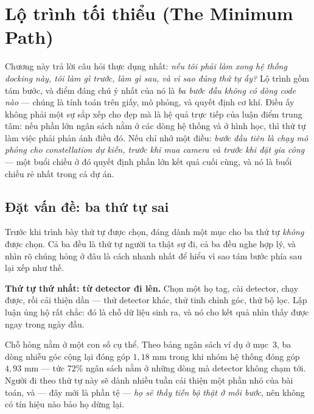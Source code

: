 \documentclass[../../marker.tex]{subfiles}
\begin{document}
\chapter{Lộ trình tối thiểu (The Minimum Path)}

\begin{tomtat}
Chương này trả lời câu hỏi thực dụng nhất: \emph{nếu tôi phải làm xong hệ thống docking này, tôi làm gì trước, làm gì sau, và vì sao đúng thứ tự ấy?} Lộ trình gồm tám bước, và điểm đáng chú ý nhất của nó là \emph{ba bước đầu không có dòng code nào} --- chúng là tính toán trên giấy, mô phỏng, và quyết định cơ khí. Điều ấy không phải một sự sắp xếp cho đẹp mà là hệ quả trực tiếp của luận điểm trung tâm: nếu phần lớn ngân sách nằm ở các dòng hệ thống và ở hình học, thì thứ tự làm việc phải phản ánh điều đó. Nếu chỉ nhớ một điều: \emph{bước đầu tiên là chạy mô phỏng cho constellation dự kiến, trước khi mua camera và trước khi đặt gia công} --- một buổi chiều ở đó quyết định phần lớn kết quả cuối cùng, và nó là buổi chiều rẻ nhất trong cả dự án.
\end{tomtat}

\section{Đặt vấn đề: ba thứ tự sai}

Trước khi trình bày thứ tự được chọn, đáng dành một mục cho ba thứ tự \emph{không} được chọn. Cả ba đều là thứ tự người ta thật sự đi, cả ba đều nghe hợp lý, và nhìn rõ chúng hỏng ở đâu là cách nhanh nhất để hiểu vì sao tám bước phía sau lại xếp như thế.

\textbf{Thứ tự thứ nhất: từ detector đi lên.} Chọn một họ tag, cài detector, chạy được, rồi cải thiện dần --- thử detector khác, thử tinh chỉnh góc, thử bộ lọc. Lập luận ủng hộ rất chắc: đó là chỗ dữ liệu sinh ra, và nó cho kết quả nhìn thấy được ngay trong ngày đầu.

Chỗ hỏng nằm ở một con số cụ thể. Theo bảng ngân sách ví dụ ở  mục~3, ba dòng nhiễu góc cộng lại đóng góp \(1{,}18\) mm trong khi nhóm hệ thống đóng góp \(4{,}93\) mm --- tức 72\% ngân sách nằm ở những dòng mà detector không chạm tới. Người đi theo thứ tự này sẽ dành nhiều tuần cải thiện một phần nhỏ của bài toán, và --- đây mới là phần tệ --- \emph{họ sẽ thấy tiến bộ thật ở mỗi bước}, nên không có tín hiệu nào bảo họ dừng lại.
\end{document}
